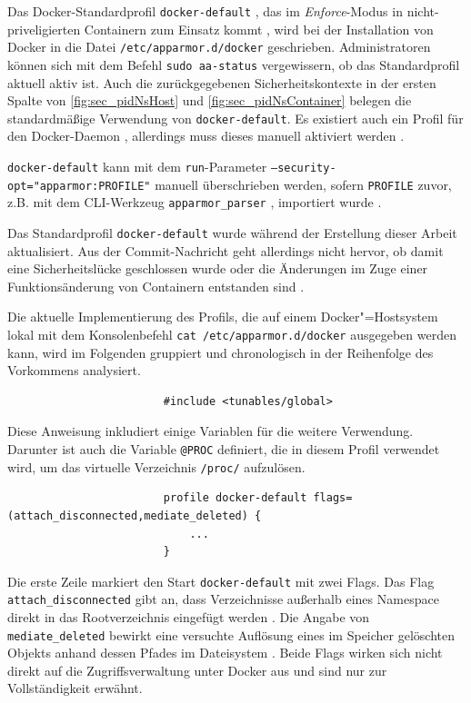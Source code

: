 \documentclass[../main.tex]{subfiles}
\begin{document}
				Das Docker-Standardprofil \texttt{docker-default} \cite{githubAppArmorProfileContainer}, das im \emph{Enforce}-Modus in nicht-priveligierten Containern zum Einsatz kommt \cite{docker110Security}, wird bei der Installation von Docker in die Datei \texttt{/etc/apparmor.d/docker} geschrieben. Administratoren können sich mit dem Befehl \texttt{sudo aa-status} vergewissern, ob das Standardprofil aktuell aktiv ist. Auch die zurückgegebenen Sicherheitskontexte in der ersten Spalte von \fig \ref{fig:sec_pidNsHost} und \fig \ref{fig:sec_pidNsContainer} belegen die standardmäßige Verwendung von \texttt{docker-default}. Es existiert auch ein Profil für den Docker-Daemon \cite{githubAppArmorProfileDaemon}, allerdings muss dieses manuell aktiviert werden \cite{githubAppArmorDoc}.

				\texttt{docker-default} kann mit dem \texttt{run}-Parameter \texttt{--security-opt="{}apparmor:PROFILE"{}} manuell überschrieben werden, sofern \texttt{PROFILE} zuvor, z.B. mit dem \acrshort{CLI}-Werkzeug \texttt{apparmor\_parser} \cite{apparmorParser}, importiert wurde \cite{dockerRun}.


					Das Standardprofil \texttt{docker-default} wurde während der Erstellung dieser Arbeit aktualisiert. Aus der Commit-Nachricht geht allerdings nicht hervor, ob damit eine Sicherheitslücke geschlossen wurde oder die Änderungen im Zuge einer Funktionsänderung von Containern entstanden sind \cite{githubAppArmorProfileContainerFix}.

					Die aktuelle Implementierung des Profils, die auf einem Docker"=Hostsystem lokal mit dem Konsolenbefehl \texttt{cat /etc/apparmor.d/docker} ausgegeben werden kann, wird im Folgenden gruppiert und chronologisch in der Reihenfolge des Vorkommens analysiert.

					\begin{lstlisting}
						#include <tunables/global>
					\end{lstlisting}
					Diese Anweisung inkludiert einige Variablen für die weitere Verwendung. Darunter ist auch die Variable \texttt{@{PROC}} definiert, die in diesem Profil verwendet wird, um das virtuelle Verzeichnis \texttt{/proc/} aufzulösen.

					\begin{lstlisting}
						profile docker-default flags=(attach_disconnected,mediate_deleted) {
							...
						}
					\end{lstlisting}
					Die erste Zeile markiert den Start \texttt{docker-default} mit zwei Flags. Das Flag \texttt{attach\_disconnected} gibt an, dass Verzeichnisse außerhalb eines Namespace direkt in das Rootverzeichnis eingefügt werden \cite{apparmorPolicyReference}. Die Angabe von \texttt{mediate\_deleted} bewirkt eine versuchte Auflösung eines im Speicher gelöschten Objekts anhand dessen Pfades im Dateisystem \cite{apparmorFAQ}. Beide Flags wirken sich nicht direkt auf die Zugriffsverwaltung unter Docker aus und sind nur zur Vollständigkeit erwähnt.
\end{document}
